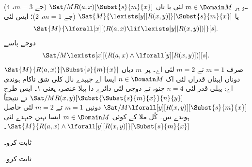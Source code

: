 \documentclass[../../../include/open-logic-section]{subfiles}
\begin{document}
\begin{ex}
سو ہر $m \in \Domain M$ لئی یا تاں
$\Sat/{M}{R(a,x)}[\Subst{s}{m}{x}]$ (جے $m = 3$، $4$) یا
$\Sat{M}{\lexists[y][R(x,y)]}[\Subst{s}{m}{x}]$ (جے $m = 1$، $2$)؛
ایس لئی
\[
\Sat{M}{\lforall[x][(R(a,x) \lif \lexists[y][R(x,y)])]}[s].
\]
دوجے پاسے
\[
\Sat/{M}{\lexists[x][(R(a,x) \land \lforall[y][R(x,y)])]}[s].
\]
$\Sat{M}{R(a,x)}[\Subst{s}{m}{x}]$ صرف $m = 1$ تے $m =
2$ لئی اے۔ پر~$m$ دیاں دوناں ایہناں قدراں لئی اک
$n \in
\Domain M$ ایسا اے جیہدے نال کلی شق ناکام ہوندی اے:
پہلی قدر لئی $n = 4$ چنو، تے دوجی لئی دائرے دا پہلا عنصر، یعنی ۱۔
ایس طرح $\Sat/{M}{R(x,y)}[\Subst{\Subst{s}{m}{x}}{n}{y}]$
تے نتیجتاً $\Sat/{M}{\lforall[y][R(x,y)]}[\Subst{s}{m}{x}]$
دونیں $m = 1$ تے $m =
2$ لئی حاصل ہوندے نیں۔ کُل ملا کے کوئی
$m \in \Domain M$ ایسا نہیں جیہدے لئی $\Sat{M}{R(a,x)
\land \lforall[y][R(x,y)]}[\Subst{s}{m}{x}]$۔
\end{ex}


\begin{prob}
   ثابت کرو۔
\end{prob}
\tagendprob


\begin{prob}
   ثابت کرو۔
\end{prob}
\tagendprob
\end{document}
